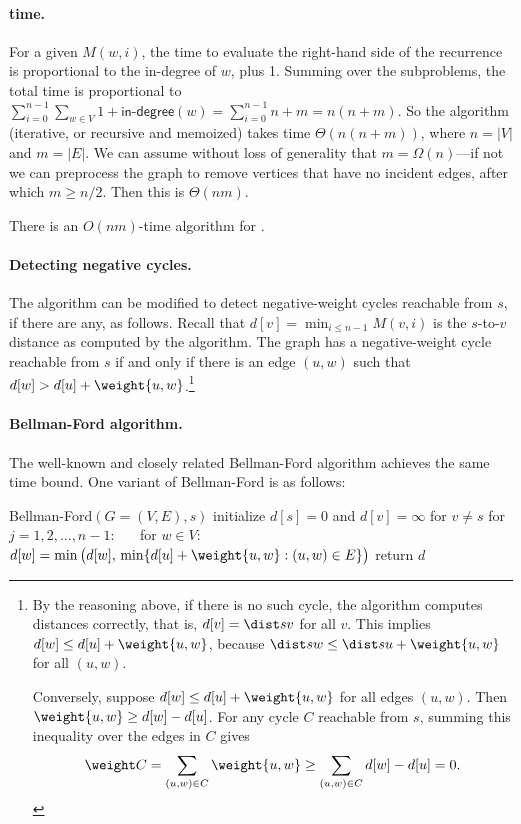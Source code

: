 \paragraph{time.}
For a given $M(w, i)$, the time to evaluate the right-hand side of the recurrence
is proportional to the in-degree of $w$, plus 1.
Summing over the subproblems, the total time
is proportional to $\sum_{i=0}^{n-1} \sum_{w\in V} 1+\textsf{in-degree}(w) = \sum_{i=0}^{n-1} n+m = n(n+m)$.
So the algorithm (iterative, or recursive and memoized)
takes time $\Theta(n(n+m))$, where $n=|V|$ and $m=|E|$.
We can assume without loss of generality that $m=\Omega(n)$---if not we can preprocess the graph to remove vertices that have no incident edges, after which $m \ge n/2$.
Then this is $\Theta(nm)$.

\begin{theorem}
  There is an $O(nm)$-time algorithm for .
\end{theorem}

\paragraph{Detecting negative cycles.}
The algorithm can be modified to detect negative-weight cycles reachable from $s$,
if there are any, as follows.
Recall that $d[v] = \min_{i\le n-1} M(v, i)$ is the $s$-to-$v$ distance as computed by the algorithm.
The graph has a negative-weight cycle reachable from $s$ if and only if
there is an edge $(u, w)$ such that $d[w] > d[u] + \weight {u, w}$.\footnote
{By the reasoning above, if there is no such cycle, the algorithm computes distances correctly,
  that is, $d[v] = \dist s v$ for all $v$.  This implies $d[w] \le d[u] + \weight {u ,w}$,
  because $\dist s w \le \dist s u + \weight {u, w}$ for all $(u,w)$.

  Conversely, suppose $d[w] \le d[u] + \weight {u, w}$ for all edges $(u,w)$.
  Then $\weight{u, w} \ge d[w] - d[u]$.
  For any cycle $C$ reachable from $s$,
  summing this inequality over the edges in $C$ gives
  \[\weight C = \sum_{(u,w) \in C} \weight{u,w} \ge \sum_{(u, w)\in C} d[w] - d[u] = 0.\]}

\paragraph{Bellman-Ford algorithm.}
The well-known and closely related Bellman-Ford algorithm achieves the same time bound.
One variant of Bellman-Ford is as follows:
\begin{myframed}
  \begin{steps}
  \item[] \textsf{Bellman-Ford}$(G=(V, E), s)$
    \step initialize $d[s] = 0$ and $d[v] = \infty$ for $v\ne s$
    \step for $j=1,2,\ldots, n-1$:
    \step~~~for $w\in V$:
    \step~~~~~~$d[w] = \min\big( d[w],\, \min\{ d[u] + \weight{u,w} : (u, w)\in E\} \big)$
    \step return $d$
  \end{steps}
\end{myframed}

